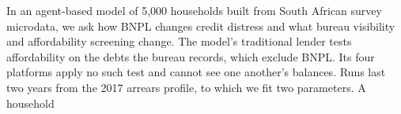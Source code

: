 \documentclass[12pt, a4paper]{article}
\begin{document}
In an agent-based model of 5{,}000 households built from South African survey microdata, we ask
how \ac{BNPL} changes credit distress and what bureau visibility and affordability screening
change. The model's traditional lender tests affordability on the debts the bureau records, which
exclude \ac{BNPL}. Its four platforms apply no such test and cannot see one another's balances.
Runs last two years from the 2017 arrears profile, to which we fit two parameters. A household
\end{document}
